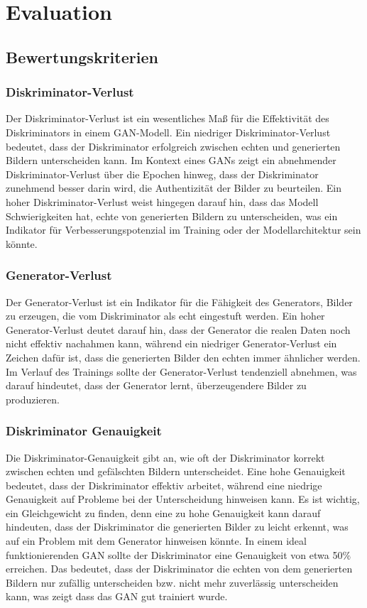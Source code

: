 \chapter{Evaluation}
\section{Bewertungskriterien}
\subsection{Diskriminator-Verlust}
Der Diskriminator-Verlust ist ein wesentliches Maß für die Effektivität des Diskriminators in einem GAN-Modell. Ein niedriger Diskriminator-Verlust bedeutet, dass der Diskriminator erfolgreich zwischen echten und generierten Bildern unterscheiden kann. Im Kontext eines GANs zeigt ein abnehmender Diskriminator-Verlust über die Epochen hinweg, dass der Diskriminator zunehmend besser darin wird, die Authentizität der Bilder zu beurteilen. Ein hoher Diskriminator-Verlust weist hingegen darauf hin, dass das Modell Schwierigkeiten hat, echte von generierten Bildern zu unterscheiden, was ein Indikator für Verbesserungspotenzial im Training oder der Modellarchitektur sein könnte.

\subsection{Generator-Verlust}
Der Generator-Verlust ist ein Indikator für die Fähigkeit des Generators, Bilder zu erzeugen, die vom Diskriminator als echt eingestuft werden. Ein hoher Generator-Verlust deutet darauf hin, dass der Generator die realen Daten noch nicht effektiv nachahmen kann, während ein niedriger Generator-Verlust ein Zeichen dafür ist, dass die generierten Bilder den echten immer ähnlicher werden. Im Verlauf des Trainings sollte der Generator-Verlust tendenziell abnehmen, was darauf hindeutet, dass der Generator lernt, überzeugendere Bilder zu produzieren.

\subsection{Diskriminator Genauigkeit}
Die Diskriminator-Genauigkeit gibt an, wie oft der Diskriminator korrekt zwischen echten und gefälschten Bildern unterscheidet. Eine hohe Genauigkeit bedeutet, dass der Diskriminator effektiv arbeitet, während eine niedrige Genauigkeit auf Probleme bei der Unterscheidung hinweisen kann. Es ist wichtig, ein Gleichgewicht zu finden, denn eine zu hohe Genauigkeit kann darauf hindeuten, dass der Diskriminator die generierten Bilder zu leicht erkennt, was auf ein Problem mit dem Generator hinweisen könnte.\newline
In einem ideal funktionierenden GAN sollte der Diskriminator eine Genauigkeit von etwa 50$\%$ erreichen. Das bedeutet, dass der Diskriminator die echten von dem generierten Bildern nur zufällig unterscheiden bzw. nicht mehr zuverlässig unterscheiden kann, was zeigt dass das GAN gut trainiert wurde.

